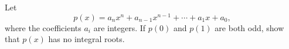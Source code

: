 Let \[ p(x) = a_nx^n + a_{n-1}x^{n-1} + \cdots + a_1x+a_0, \] where the coefficients $a_i$ are integers. If $p(0)$ and $p(1)$ are both odd, show that $p(x)$ has no integral roots.